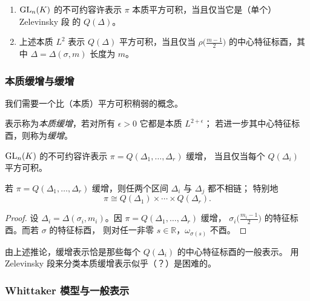 \begin{theorem}[Zelevinsky]
\leavevmode
\begin{enumerate}[label=(\arabic*),leftmargin=2.2em]
\item $\mathrm{GL}_n(K)$ 的不可约容许表示 $\pi$ 本质平方可积，当且仅当它是（单个）Zelevinsky 段
      的 $Q(\Delta)$。
\item 上述本质 $L^2$ 表示 $Q(\Delta)$ 平方可积，当且仅当 $\rho\bigl(\frac{m-1}{2}\bigr)$
      的中心特征标酉，其中 $\Delta=\Delta(\sigma,m)$ 长度为 $m$。
\end{enumerate}
\end{theorem}

\subsubsection{本质缓增与缓增}

我们需要一个比（本质）平方可积稍弱的概念。

\begin{definition}
表示称为\emph{本质缓增}，若对所有 $\epsilon>0$ 它都是本质 $L^{2+\epsilon}$；
若进一步其中心特征标酉，则称为\emph{缓增}。
\end{definition}

\begin{theorem}[Zelevinsky]
$\mathrm{GL}_n(K)$ 的不可约容许表示 $\pi=Q(\Delta_1,\dots,\Delta_r)$ 缓增，
当且仅当每个 $Q(\Delta_i)$ 平方可积。
\end{theorem}

\begin{corollary}
若 $\pi=Q(\Delta_1,\dots,\Delta_r)$ 缓增，则任两个区间 $\Delta_i$ 与 $\Delta_j$ 都不相链；
特别地
\[
\pi\cong Q(\Delta_1)\times\cdots\times Q(\Delta_r).
\]
\end{corollary}

\begin{proof}
设 $\Delta_i=\Delta(\sigma_i,m_i)$。因 $\pi=Q(\Delta_1,\dots,\Delta_r)$ 缓增，
$\sigma_i\bigl(\frac{m_i-1}{2}\bigr)$ 的特征标酉。而若 $\sigma$ 的特征标酉，
则对任一非零 $s\in\mathbb{R}$，$\omega_{\sigma(s)}$ 不酉。
\end{proof}

\begin{remark}
由上述推论，缓增表示恰是那些每个 $Q(\Delta_i)$ 的中心特征标酉的一般表示。
用 Zelevinsky 段来分类本质缓增表示似乎（？）是困难的。
\end{remark}

\subsubsection{Whittaker 模型与一般表示}

